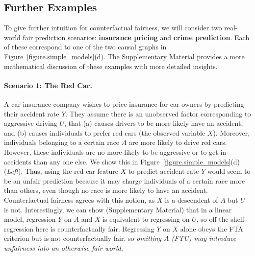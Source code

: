 
\subsection{Further Examples}
\label{sec:further_examples}

To give further intuition for counterfactual fairness, we will consider
two real-world fair prediction scenarios: \textbf{insurance pricing}
and \textbf{crime prediction}. Each of these correspond to one of the
two causal graphs in Figure~\ref{figure.simple_models}(d). The
Supplementary Material provides a more mathematical discussion of
these examples with more detailed insights.

\paragraph{Scenario 1: The Red Car.}
A car insurance company wishes to price insurance for car
owners by predicting their accident rate $Y$. They assume there is an
unobserved factor corresponding to aggressive driving $U$, that (a)
causes drivers to be more likely have an accident, and (b) causes
individuals to prefer red cars (the observed variable $X$). Moreover,
individuals belonging to a certain race $A$ are more likely to drive
red cars. However, these individuals are no more likely to be
aggressive or to get in accidents than any one else. We show this in
Figure~\ref{figure.simple_models}(d) (\emph{Left}). Thus, using the
red car feature $X$ to predict accident rate $Y$ would seem to be an
unfair prediction because it may charge individuals of a certain race
more than others, even though no race is more likely to have an
accident. Counterfactual fairness agrees with this notion, as $X$
is a descendent of $A$ but $U$ is not. Interestingly, we can show
(Supplementary Material) that in a linear model, regression $Y$ on $A$
and $X$ is equivalent to regressing on $U$, so off-the-shelf
regression here is counterfactually fair. Regressing $Y$ on $X$ alone
obeys the FTA criterion but is not counterfactually fair, so
{\em omitting $A$ (FTU) may introduce unfairness into
  an otherwise fair world.}
%
